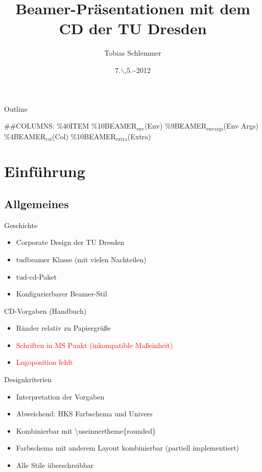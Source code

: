 \documentclass[presentation,t]{beamer}
\author{Tobias Schlemmer}
\date{7.$\backslash$,5.\textasciitilde{}2012}
\title{Beamer-Präsentationen mit dem CD der TU Dresden}
\begin{document}
\maketitle
\begin{frame}{Outline}
\tableofcontents
\end{frame}

\#\#COLUMNS: \%40ITEM \%10BEAMER$_{\text{env}}$(Env) \%9BEAMER$_{\text{envargs}}$(Env Args) \%4BEAMER$_{\text{col}}$(Col) \%10BEAMER$_{\text{extra}}$(Extra)
\section{Einführung}
\label{sec-1}
\subsection{Allgemeines}
\label{sec-1-1}
\begin{frame}[label=sec-1-1-1]{Geschichte}
\begin{itemize}
\item Corporate Design der TU Dresden
\item tudbeamer Klasse (mit vielen Nachteilen)
\item tud-cd-Paket
\item \alert{Konfigurierbarer Beamer-Stil}
\end{itemize}
\end{frame}
\begin{frame}[label=sec-1-1-2]{CD-Vorgaben (Handbuch)}
\begin{itemize}
\item \textcolor{HKS65K100}{Ränder relativ zu Papiergrüße}
\item \textcolor{red}{Schriften in MS Punkt (inkompatible Maßeinheit)}
\item \textcolor{red}{Logoposition fehlt}
\end{itemize}
\end{frame}
\begin{frame}[label=sec-1-1-3]{Designkriterien}
\begin{itemize}
\item Interpretation der Vorgaben
\item Abweichend: HKS Farbschema und Univers
\item Kombinierbar mit \textbackslash useinnertheme\{rounded\}
\item Farbschema mit anderem Layout kombinierbar (partiell implementiert)
\item Alle Stile überschreibbar
\end{itemize}
\end{frame}
\end{document}
